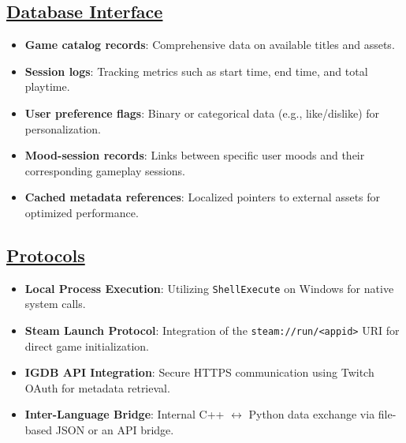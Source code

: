 \subsection{\underline{Database Interface}}
\begin{itemize}
    \item \textbf{Game catalog records}: Comprehensive data on available titles and assets.
    \item \textbf{Session logs}: Tracking metrics such as start time, end time, and total playtime.
    \item \textbf{User preference flags}: Binary or categorical data (e.g., like/dislike) for personalization.
    \item \textbf{Mood-session records}: Links between specific user moods and their corresponding gameplay sessions.
    \item \textbf{Cached metadata references}: Localized pointers to external assets for optimized performance.
\end{itemize}

\subsection{\underline{Protocols}}
\begin{itemize}
    \item \textbf{Local Process Execution}: Utilizing \texttt{ShellExecute} on Windows for native system calls.
    \item \textbf{Steam Launch Protocol}: Integration of the \texttt{steam://run/<appid>} URI for direct game initialization.
    \item \textbf{IGDB API Integration}: Secure HTTPS communication using Twitch OAuth for metadata retrieval.
    \item \textbf{Inter-Language Bridge}: Internal C++ $\leftrightarrow$ Python data exchange via file-based JSON or an API bridge.
\end{itemize}
